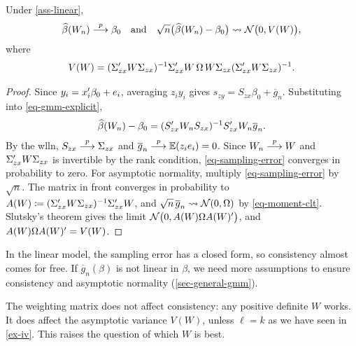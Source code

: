 \documentclass[a4paper,12pt]{article}
\begin{document}
\begin{theorem}\label{thm-linear-asymptotics}
	Under \autoref{ass-linear},
	\begin{align}
		\widehat\beta(W_n)\overset{p}{\longrightarrow}\beta_0
		\quad\text{and}\quad
		\sqrt n\bigl(\widehat\beta(W_n)-\beta_0\bigr)\overset{}{\leadsto}\operatorname{\mathcal{N}}\bigl(0,V(W)\bigr),
	\end{align}
	where
	\begin{align}\label{eq-avar}
		V(W)=(\Sigma_{zx}^{\prime} W\Sigma_{zx})^{-1}\Sigma_{zx}^{\prime} W\,\Omega\,W\Sigma_{zx}(\Sigma_{zx}^{\prime} W\Sigma_{zx})^{-1}.
	\end{align}
\end{theorem}
\begin{proof}
	Since $y_i=x_i^{\prime}\beta_0+e_i$, averaging $z_iy_i$ gives $s_{zy}=S_{zx}\beta_0+\overline g_n$.
	Substituting into \eqref{eq-gmm-explicit},
	\begin{align}\label{eq-sampling-error}
		\widehat\beta(W_n)-\beta_0=(S_{zx}^{\prime} W_nS_{zx})^{-1} S_{zx}^{\prime} W_n\overline g_n.
	\end{align}
	By the \gls{wlln}, $S_{zx}\overset{p}{\longrightarrow}\Sigma_{zx}$ and $\overline g_n\overset{p}{\longrightarrow}\operatorname{\mathbb{E}}(z_ie_i)=0$.
	Since $W_n\overset{p}{\longrightarrow} W$ and $\Sigma_{zx}^{\prime} W\Sigma_{zx}$ is invertible by the rank condition,
	\eqref{eq-sampling-error} converges in probability to zero.
	For asymptotic normality, multiply \eqref{eq-sampling-error} by $\sqrt n$.
	The matrix in front converges in probability to $A(W)\coloneqq(\Sigma_{zx}^{\prime} W\Sigma_{zx})^{-1}\Sigma_{zx}^{\prime} W$,
	and $\sqrt n\,\overline g_n\overset{}{\leadsto}\operatorname{\mathcal{N}}(0,\Omega)$ by \eqref{eq-moment-clt}.
	Slutsky's theorem gives the limit $\operatorname{\mathcal{N}}\bigl(0,A(W)\Omega A(W)^{\prime}\bigr)$, and $A(W)\Omega A(W)^{\prime}=V(W)$.
\end{proof}

\begin{remark}
	In the linear model, the sampling error has a closed form, so consistency almost comes for free.
	If $\overline g_n(\beta)$ is not linear in $\beta$,
	we need more assumptions to ensure consistency and asymptotic normality (\autoref{sec-general-gmm}).
\end{remark}

\begin{remark}
	The weighting matrix does not affect consistency: any positive definite $W$ works.
	It does affect the asymptotic variance $V(W)$, unless $\ell=k$ as we have seen in \autoref{ex-iv}.
	This raises the question of which $W$ is best.
\end{remark}
\end{document}

